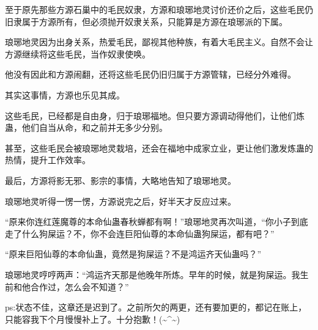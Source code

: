 \begin{this_body}
至于原先那些方源石巢中的毛民奴隶，方源和琅琊地灵讨价还价之后，这些毛民仍旧隶属于方源所有，但必须抛开奴隶关系，只能算是方源在琅琊派的下属。

琅琊地灵因为出身关系，热爱毛民，鄙视其他种族，有着大毛民主义。自然不会让方源继续将这些毛民，当作奴隶使唤。

他没有因此和方源闹翻，还将这些毛民仍旧归属于方源管辖，已经分外难得。

其实这事情，方源也乐见其成。

这些毛民，已经都是自由身，归于琅琊福地。但只要方源调动得他们，让他们炼蛊，他们自当从命，和之前并无多少分别。

甚至，这些毛民会被琅琊地灵栽培，还会在福地中成家立业，更让他们激发炼蛊的热情，提升工作效率。

最后，方源将影无邪、影宗的事情，大略地告知了琅琊地灵。

琅琊地灵听得一愣一愣，方源说完之后，好半天才反应过来。

“原来你连红莲魔尊的本命仙蛊春秋蝉都有啊！”琅琊地灵再次叫道，“你小子到底走了什么狗屎运？不，你不会连巨阳仙尊的本命仙蛊狗屎运，都有吧？”

“原来巨阳仙尊的本命仙蛊，竟然是狗屎运？不是鸿运齐天仙蛊吗？”

琅琊地灵哼哼两声：“鸿运齐天那是他晚年所炼。早年的时候，就是狗屎运。我生前和他合作过，怎么会不知道？”

ps:状态不佳，这章还是迟到了。之前所欠的两更，还有要加更的，都记在账上，只能容我下个月慢慢补上了。十分抱歉！(\~{}\^{}\~{})

\end{this_body}

